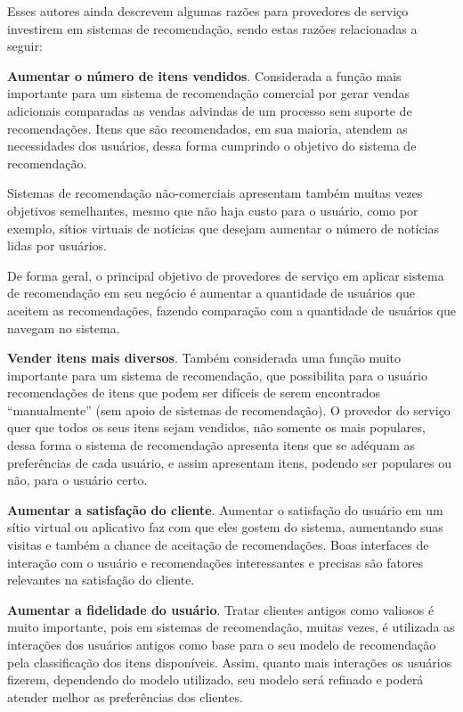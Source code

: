 Esses autores ainda descrevem algumas razões para provedores de serviço investirem em sistemas de recomendação, sendo estas razões relacionadas a seguir:

\textbf{Aumentar o número de itens vendidos}. Considerada a função mais importante para um sistema de recomendação comercial por gerar vendas adicionais comparadas as vendas advindas de um processo sem suporte de recomendações. Itens que são recomendados, em sua maioria, atendem as necessidades dos usuários, dessa forma cumprindo o objetivo do sistema de recomendação.

Sistemas de recomendação não-comerciais apresentam também muitas vezes objetivos semelhantes, mesmo que não haja custo para o usuário, como por exemplo, sítios virtuais de notícias que desejam aumentar o número de notícias lidas por usuários.

De forma geral, o principal objetivo de provedores de serviço em aplicar sistema de recomendação em seu negócio é aumentar a quantidade de usuários que aceitem as recomendações, fazendo comparação com a quantidade de usuários que navegam no sistema.

\textbf{Vender itens mais diversos}. Também considerada uma função muito importante para um sistema de recomendação, que possibilita para o usuário recomendações de itens que podem ser difíceis de serem encontrados “manualmente” (sem apoio de sistemas de recomendação). O provedor do serviço quer que todos os seus itens sejam vendidos, não somente os mais populares, dessa forma o sistema de recomendação apresenta itens que se adéquam as preferências de cada usuário, e assim apresentam itens, podendo ser populares ou não, para o usuário certo.

\textbf{Aumentar a satisfação do cliente}. Aumentar o satisfação do usuário em um sítio virtual ou aplicativo faz com que eles gostem do sistema, aumentando suas visitas e também a chance de aceitação de recomendações. Boas interfaces de interação com o usuário e recomendações interessantes e precisas são fatores relevantes na satisfação do cliente.

\textbf{Aumentar a fidelidade do usuário}. Tratar clientes antigos como valiosos é muito importante, pois em sistemas de recomendação, muitas vezes, é utilizada as interações dos usuários antigos como base para o seu modelo de recomendação pela classificação dos itens disponíveis. Assim, quanto mais interações os usuários fizerem, dependendo do modelo utilizado, seu modelo será refinado e poderá atender melhor as preferências dos clientes.

